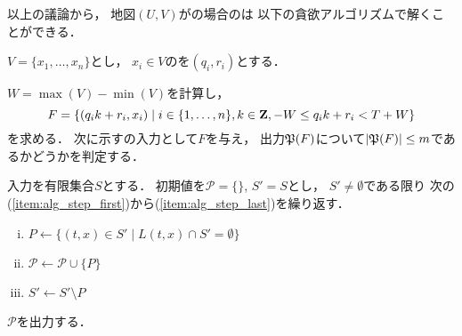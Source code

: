 以上の議論から，
地図$(U, V)$が{\graphLine}の場合の{\timeSpecifiedPP}は
以下の貪欲アルゴリズムで解くことができる．

$V = \{ x_1, \ldots, x_n \}$とし，
$x_i \in V$の{\exactTime}を$(q_i, r_i)$とする．

$W = \max(V) - \min(V)$を計算し，
%
\[
  F = \{ (q_i k + r_i, x_i) \mid
    i \in \{ 1, \ldots, n \},
    k \in \mathbf Z, -W \leq q_i k + r_i < T + W \}
\]
を求める．
次に示す{\setPartAlgo}の入力として$F$を与え，
出力$\mathfrak{P}(F)$について$\lvert{\mathfrak{P}(F)}\rvert \leq m$であるかどうかを判定する．

\begin{setPartitionAlgorithm}
  入力を有限集合$S$とする．
  初期値を$\mathcal{P} = \{\}$, $S' = S$とし，
  $S' \neq \emptyset$である限り
  次の(\ref{item:alg_step_first})から(\ref{item:alg_step_last})を繰り返す．
  \begin{enumerate}[(i)]
  \item \label{item:alg_step_first}
    $P \gets \{ (t, x) \in S' \mid L(t, x) \cap S' = \emptyset \}$
  \item
    $\mathcal{P} \gets \mathcal{P} \cup \{ P \}$
  \item \label{item:alg_step_last}
    $S' \gets S' \setminus P$
  \end{enumerate}
  $\mathcal{P}$を出力する．
\end{setPartitionAlgorithm}


